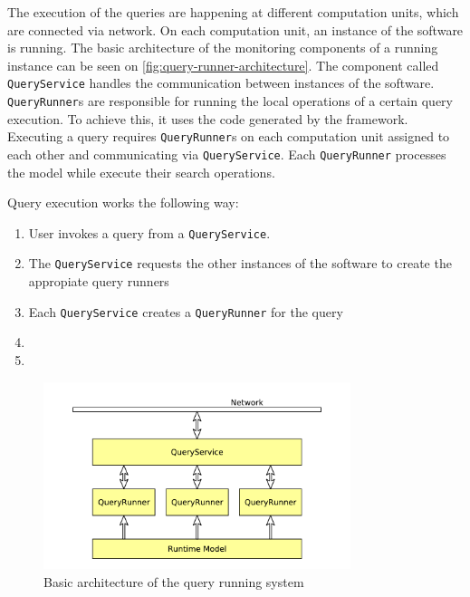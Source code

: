 The execution of the queries are happening at different computation units, which are connected via network.
On each computation unit, an instance of the software is running.
The basic architecture of the monitoring components of a running instance can be seen on \autoref{fig:query-runner-architecture}. 
The component called \texttt{QueryService} handles the communication between instances of the software.
\texttt{QueryRunner}s are responsible for running the local operations of a certain query execution. 
To achieve this, it uses the code generated by the framework.
Executing a query requires \texttt{QueryRunner}s on each computation unit assigned to each other and communicating via \texttt{QueryService}. 
Each \texttt{QueryRunner} processes the model while execute their search operations.

Query execution works the following way:
\begin{enumerate}
\item User invokes a query from a \texttt{QueryService}.
\item The \texttt{QueryService} requests the other instances of the software to create the appropiate query runners
\item Each \texttt{QueryService} creates a \texttt{QueryRunner} for the query
\item
\item
\end{enumerate}


\begin{figure}[H]
	\begin{center}
		\includegraphics[width=0.8\textwidth]{figures/query-runner-architecture.pdf}
		\caption{ Basic architecture of the query running system }
		\label{fig:query-runner-architecture}
	\end{center}
\end{figure}









